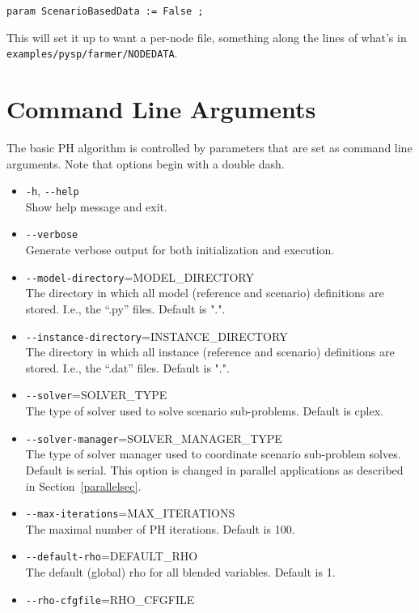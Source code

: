 \verb|param ScenarioBasedData := False ;|

This will set it up to want a per-node file, something along the lines of what's in \verb|examples/pysp/farmer/NODEDATA|.

\section{Command Line Arguments \label{cmdargsec}}

The basic PH algorithm is controlled by parameters that are set as command line arguments. Note that options begin with a double dash.
\begin{itemize}
  \item \verb|-h|, \verb|--help|\\            Show help message and exit.
  \item \verb|--verbose|\\             Generate verbose output for both initialization and execution.
  \item \verb|--model-directory|=MODEL\_DIRECTORY\\
                        The directory in which all model (reference and scenario) definitions are stored. I.e., the ``.py'' files. Default is ".".
  \item \verb|--instance-directory|=INSTANCE\_DIRECTORY\\
                        The directory in which all instance (reference and scenario) definitions are stored. I.e., the ``.dat'' files. Default is ".".
  \item \verb|--solver|=SOLVER\_TYPE\\  The type of solver used to solve scenario sub-problems. Default is cplex.
  \item \verb|--solver-manager|=SOLVER\_MANAGER\_TYPE\\
                        The type of solver manager used to coordinate scenario sub-problem solves. Default is serial. This option is changed in parallel applications
as described in Section~\ref{parallelsec}.
  \item \verb|--max-iterations|=MAX\_ITERATIONS\\
                        The maximal number of PH iterations. Default is 100.
  \item \verb|--default-rho|=DEFAULT\_RHO\\
                        The default (global) rho for all blended variables. Default is 1.
  \item \verb|--rho-cfgfile|=RHO\_CFGFILE\\

\end{itemize}
